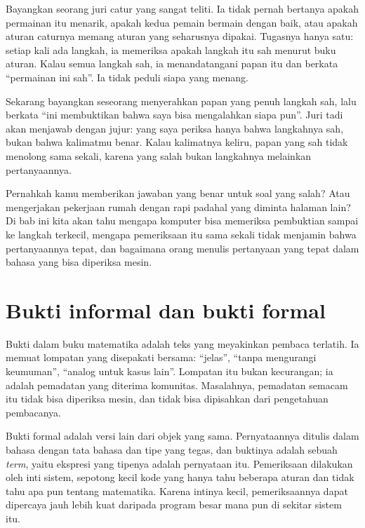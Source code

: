 \begin{untukanak}
Bayangkan seorang juri catur yang sangat teliti. Ia tidak pernah bertanya apakah permainan itu
menarik, apakah kedua pemain bermain dengan baik, atau apakah aturan caturnya memang aturan yang
seharusnya dipakai. Tugasnya hanya satu: setiap kali ada langkah, ia memeriksa apakah langkah itu
sah menurut buku aturan. Kalau semua langkah sah, ia menandatangani papan itu dan berkata
``permainan ini sah''. Ia tidak peduli siapa yang menang.

Sekarang bayangkan seseorang menyerahkan papan yang penuh langkah sah, lalu berkata ``ini
membuktikan bahwa saya bisa mengalahkan siapa pun''. Juri tadi akan menjawab dengan jujur: yang
saya periksa hanya bahwa langkahnya sah, bukan bahwa kalimatmu benar. Kalau kalimatnya keliru,
papan yang sah tidak menolong sama sekali, karena yang salah bukan langkahnya melainkan
pertanyaannya.

Pernahkah kamu memberikan jawaban yang benar untuk soal yang salah? Atau mengerjakan pekerjaan
rumah dengan rapi padahal yang diminta halaman lain? Di bab ini kita akan tahu mengapa komputer
bisa memeriksa pembuktian sampai ke langkah terkecil, mengapa pemeriksaan itu sama sekali tidak
menjamin bahwa pertanyaannya tepat, dan bagaimana orang menulis pertanyaan yang tepat dalam
bahasa yang bisa diperiksa mesin.
\end{untukanak}

\section{Bukti informal dan bukti formal}


Bukti dalam buku matematika adalah teks yang meyakinkan pembaca terlatih. Ia memuat lompatan yang
disepakati bersama: ``jelas'', ``tanpa mengurangi keumuman'', ``analog untuk kasus lain''. Lompatan
itu bukan kecurangan; ia adalah pemadatan yang diterima komunitas. Masalahnya, pemadatan semacam
itu tidak bisa diperiksa mesin, dan tidak bisa dipisahkan dari pengetahuan pembacanya.

Bukti formal adalah versi lain dari objek yang sama. Pernyataannya ditulis dalam bahasa dengan
tata bahasa dan tipe yang tegas, dan buktinya adalah sebuah \emph{term}, yaitu ekspresi yang
tipenya adalah pernyataan itu. Pemeriksaan dilakukan oleh inti sistem, sepotong kecil kode yang
hanya tahu beberapa aturan dan tidak tahu apa pun tentang matematika. Karena intinya kecil,
pemeriksaannya dapat dipercaya jauh lebih kuat daripada program besar mana pun di sekitar
sistem itu.

